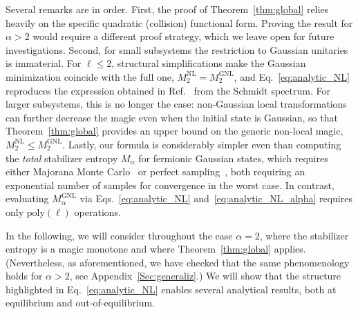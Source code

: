 \documentclass[prx,twocolumn,superscriptaddress,aps,10pt, frontmatterverbose, reprint,footinbib,longbibliography=true]{revtex4-2}
\newcommand{\RENYI}{\alpha}
\begin{document}
Several remarks are in order.
First, the proof of Theorem~\ref{thm:global} relies heavily on the specific quadratic (collision) functional form. Proving the result for $\RENYI>2$ would require a different proof strategy, which we leave open for future investigations.
Second, for small subsystems the restriction to Gaussian unitaries is immaterial. For $\ell\le 2$, structural simplifications make the Gaussian minimization coincide with the full one, $M_2^{\mathrm{NL}}=M_2^{\mathrm{GNL}}$, and Eq.~\eqref{eq:analytic_NL} reproduces the expression obtained in Ref.~\cite{Cao_2025} from the Schmidt spectrum. For larger subsystems, this is no longer the case: non-Gaussian local transformations can further decrease the magic even when the initial state is Gaussian, so that Theorem~\ref{thm:global} provides an upper bound on the generic non-local magic, $M_2^{\mathrm{NL}}\le M_2^{\mathrm{GNL}}$.
Lastly, our formula is considerably simpler even than computing the \emph{total} stabilizer entropy $M_\RENYI$ for fermionic Gaussian states, which requires either Majorana Monte Carlo~\cite{Bera_2025} or perfect sampling~\cite{collura2026nonstabilizernessfermionicgaussianstates}, both requiring an exponential number of samples for convergence in the worst case. In contrast, evaluating $M_\RENYI^\mathrm{GNL}$ via Eqs.~\eqref{eq:analytic_NL} and~\eqref{eq:analytic_NL_alpha} requires only $\mathrm{poly}(\ell)$ operations.

In the following, we will consider throughout the case $\RENYI=2$, where the stabilizer entropy is a magic monotone and where Theorem~\ref{thm:global} applies. (Nevertheless, as aforementioned, we have checked that the same phenomenology holds for $\RENYI>2$, see Appendix~\ref{Sec:generaliz}.)
We will show that the structure highlighted in Eq.~\eqref{eq:analytic_NL} enables several analytical results, both at equilibrium and out-of-equilibrium.
\end{document}
